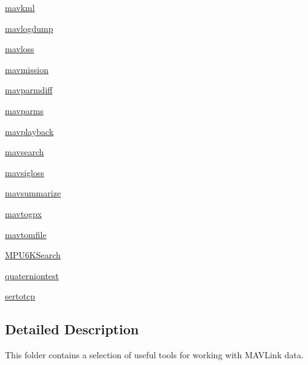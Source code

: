 \begin{DoxyCompactItemize}
\item 
 \hyperlink{namespacepymavlink_1_1tools_1_1mavkml}{mavkml}
\item 
 \hyperlink{namespacepymavlink_1_1tools_1_1mavlogdump}{mavlogdump}
\item 
 \hyperlink{namespacepymavlink_1_1tools_1_1mavloss}{mavloss}
\item 
 \hyperlink{namespacepymavlink_1_1tools_1_1mavmission}{mavmission}
\item 
 \hyperlink{namespacepymavlink_1_1tools_1_1mavparmdiff}{mavparmdiff}
\item 
 \hyperlink{namespacepymavlink_1_1tools_1_1mavparms}{mavparms}
\item 
 \hyperlink{namespacepymavlink_1_1tools_1_1mavplayback}{mavplayback}
\item 
 \hyperlink{namespacepymavlink_1_1tools_1_1mavsearch}{mavsearch}
\item 
 \hyperlink{namespacepymavlink_1_1tools_1_1mavsigloss}{mavsigloss}
\item 
 \hyperlink{namespacepymavlink_1_1tools_1_1mavsummarize}{mavsummarize}
\item 
 \hyperlink{namespacepymavlink_1_1tools_1_1mavtogpx}{mavtogpx}
\item 
 \hyperlink{namespacepymavlink_1_1tools_1_1mavtomfile}{mavtomfile}
\item 
 \hyperlink{namespacepymavlink_1_1tools_1_1MPU6KSearch}{M\+P\+U6\+K\+Search}
\item 
 \hyperlink{namespacepymavlink_1_1tools_1_1quaterniontest}{quaterniontest}
\item 
 \hyperlink{namespacepymavlink_1_1tools_1_1sertotcp}{sertotcp}
\end{DoxyCompactItemize}


\subsection{Detailed Description}
\begin{DoxyVerb}This folder contains a selection of useful tools for working with MAVLink data.\end{DoxyVerb}
 